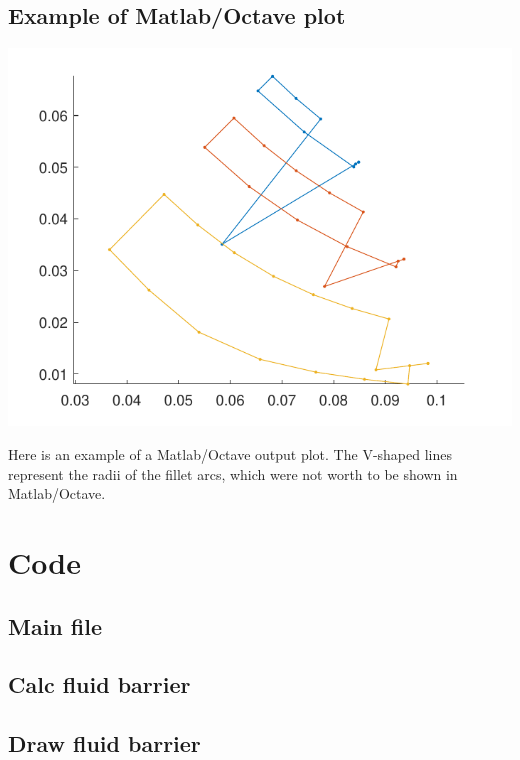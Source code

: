 \documentclass[b5paper,11pt,oneside,fleqn]{article}
\begin{document}
\subsection{Example of Matlab/Octave plot}

\includegraphics[width=0.75\linewidth]{gfx/MatlabOutput}

Here is an example of a Matlab/Octave output plot.
The V-shaped lines represent the radii of the fillet arcs, which were not worth 
to be shown in Matlab/Octave.




\clearpage
\section{Code}

\subsection{Main file}

\clearpage

\subsection{Calc fluid barrier}

\clearpage

\subsection{Draw fluid barrier}

\end{document}
